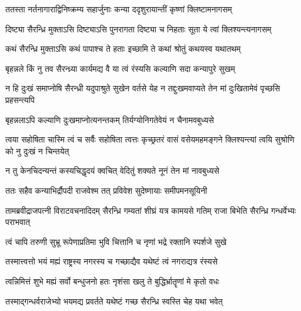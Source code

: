 \twolineshloka
{ततस्ता नर्तनागाराद्विनिष्क्रम्य सहार्जुनाः}
{कन्या ददृशुरायान्तीं कृष्णां क्लिष्टामनागसम्}




\twolineshloka
{दिष्ट्या सैरन्ध्रि मुक्ताऽसि दिष्ट्याऽसि पुनरागता}
{दिष्ट्या च निहताः सूता ये त्वां क्लिश्यन्त्यनागसम्}




\twolineshloka
{कथं सैरन्ध्रि मुक्ताऽसि कथं पापाश्च ते हताः}
{इच्छामि ते कथां श्रोतुं कथयस्व यथातथम्}




\twolineshloka
{बृहन्नले किं नु तव सैरन्ध्र्या कार्यमद्य वै}
{या त्वं रंस्यसि कल्याणि सदा कन्यापुरे सुखम्}


\threelineshloka
{न हि दुःखं समाप्नोषि सैरन्ध्री यदुपाश्रुते}
{सुखेन वर्तसे येह न तद्दुःखमवाप्यते}
{तेन मां दुःखितामेवं पृच्छसि प्रहसन्त्यपि}




\twolineshloka
{बृहन्नलाऽपि कल्याणि दुःखमाप्नोत्यनन्तकम्}
{तिर्यग्योनिगतेवेयं न चैनामवबुध्यसे}


\threelineshloka
{त्वया सहोषिता चास्मि त्वं च सर्वैः सहोषिता}
{त्वत्तः कृच्छ्रतरं वासं वसेयमहमङ्गने}
{क्लिश्यन्त्यां त्वयि सुश्रोणि को नु दुःखं न चिन्तयेत्}


\twolineshloka
{न तु केनचिदन्यन्तं कस्यचिद्धृदयं क्वचित्}
{वेदितुं शक्यते नूनं तेन मां नावबुध्यसे}



\twolineshloka
{ततः सहैव कन्याभिर्द्रौपदी राजवेश्म तत्}
{प्रविवेश सुदेष्णायाः समीपमनसूयिनी}


\threelineshloka
{तामब्रवीद्राजपत्नी विराटवचनादिदम्}
{सैरन्ध्रि गम्यतां शीघ्रं यत्र कामयसे गतिम्}
{राजा बिभेति सैरन्ध्रि गन्धर्वेभ्यः पराभवात्}


\twolineshloka
{त्वं चापि तरुणी सुभ्रू रूपेणाप्रतिमा भुवि}
{चित्तानि च नृणां भद्रे रक्तानि स्पर्शजे सुखे}


\twolineshloka
{तस्मात्त्वत्तो भयं मह्यं राष्ट्रस्य नगरस्य च}
{गच्छाद्यैव यथेष्टं त्वं नगराद्यत्र रंस्यसे}


\twolineshloka
{त्वन्निमित्तं शुभे मह्यं सर्वो बन्धुजनो हतः}
{नृशंसा खलु ते बुद्धिर्भ्रातॄणां मे कृतो वधः}


\twolineshloka
{तस्माद्गन्धर्वराजेभ्यो भयमद्य प्रवर्तते}
{यथेष्टं गच्छ सैरन्ध्रि स्वस्ति चेह यथा भवेत्}


